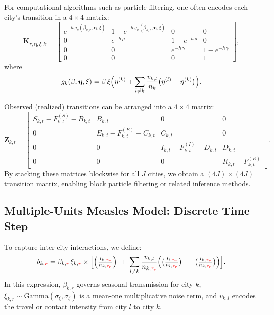 \documentclass{article}
\begin{document}
For computational algorithms such as particle filtering, one often encodes each city’s transition in a $4\times 4$ matrix:
\[
\mathbf{K}_{r,\boldsymbol{\eta},\xi,k}
=
\begin{bmatrix}
e^{-h\,g_k(\beta_{k,r},\boldsymbol{\eta},\xi)} 
  & 1 - e^{-h\,g_k(\beta_{k,r},\boldsymbol{\eta},\xi)} 
  & 0 & 0\\
0 & e^{-h\,\rho} & 1 - e^{-h\,\rho} & 0\\
0 & 0 & e^{-h\,\gamma} & 1 - e^{-h\,\gamma}\\
0 & 0 & 0 & 1
\end{bmatrix},
\]
where
\[
g_k(\beta,\boldsymbol{\eta},\xi)
=
\beta\,\xi
\Bigl(
\eta^{(k)} + \sum_{l\neq k}\frac{v_{k,l}}{n_k}\bigl(\eta^{(l)} - \eta^{(k)}\bigr)
\Bigr).
\]

Observed (realized) transitions can be arranged into a $4\times 4$ matrix:
\[
\mathbf{Z}_{k,t}
=
\begin{bmatrix}
S_{k,t}-F^{(S)}_{k,t}-B_{k,t} & B_{k,t} & 0 & 0\\
0 & E_{k,t}-F^{(E)}_{k,t}-C_{k,t} & C_{k,t} & 0\\
0 & 0 & I_{k,t}-F^{(I)}_{k,t}-D_{k,t} & D_{k,t}\\
0 & 0 & 0 & R_{k,t}-F^{(R)}_{k,t}
\end{bmatrix}.
\]
By stacking these matrices blockwise for all $J$ cities, we obtain a $(4J)\times(4J)$ transition matrix, enabling block particle filtering or related inference methods.

\subsection{Multiple-Units Measles Model: Discrete Time Step}

To capture inter-city interactions, we define:
\[
b_{k,\textcolor{red}{r}}
=
\beta_{k,\textcolor{red}{r}}\,\xi_{k,\textcolor{red}{r}}
\times
\Bigl[
  \Bigl(\tfrac{I_{k,\textcolor{red}{\tau_{r}}}}{n_{k,\textcolor{red}{\tau_{r}}}}\Bigr)
  \;+\; 
  \sum_{l \neq k} \frac{v_{k,l}}{n_{k,\textcolor{red}{\tau_{r}}}}\Bigl(
    \bigl(\tfrac{I_{l,\textcolor{red}{\tau_{r}}}}{n_{l,\textcolor{red}{\tau_{r}}}}\bigr)
    \;-\;
    \bigl(\tfrac{I_{k,\textcolor{red}{\tau_{r}}}}{n_{k,\textcolor{red}{\tau_{r}}}}\bigr)
  \Bigr)
\Bigr].
\]
In this expression, $\beta_{k,r}$ governs seasonal transmission for city $k$, $\xi_{k,r}\sim \mathrm{Gamma}(\sigma_{\xi},\sigma_{\xi})$ is a mean-one multiplicative noise term, and $v_{k,l}$ encodes the travel or contact intensity from city $l$ to city $k$.
\end{document}

